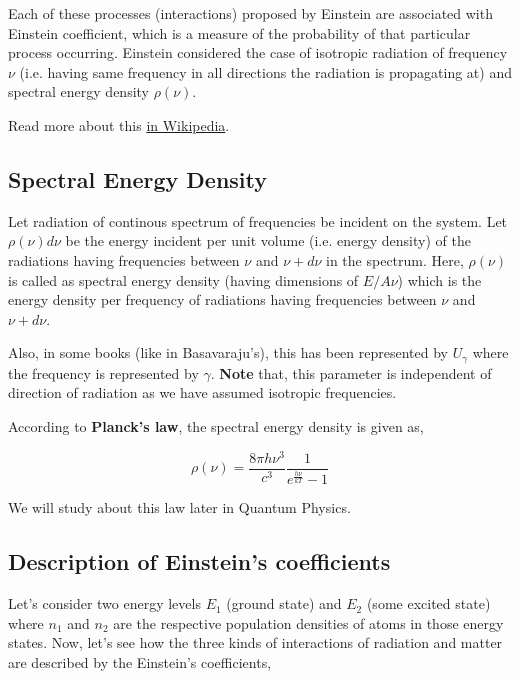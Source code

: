 \documentclass[12pt]{article}
\begin{document}
Each of these processes (interactions) proposed by Einstein are associated with Einstein coefficient, which is a measure of the probability of that particular process occurring. Einstein considered the case of isotropic radiation of frequency $\nu$ (i.e. having same frequency in all directions the radiation is propagating at) and spectral energy density $\rho(\nu)$. \vspace{.2cm}

Read more about this \href{https://en.wikipedia.org/wiki/Einstein_coefficients}{in Wikipedia}.

\subsection{Spectral Energy Density}

Let radiation of continous spectrum of frequencies be incident on the system. Let $\rho(\nu)d\nu$ be the energy incident per unit volume (i.e. energy density) of the radiations having frequencies between $\nu$ and $\nu + d\nu$ in the spectrum. Here, $\rho(\nu)$ is called as spectral energy density (having dimensions of $E/A\nu$) which is the energy density per frequency of radiations having frequencies between $\nu$ and $\nu + d\nu$. \vspace{.2cm}

Also, in some books (like in Basavaraju's), this has been represented by $U_{\gamma}$ where the frequency is represented by $\gamma$. \textbf{Note} that, this parameter is independent of direction of radiation as we have assumed isotropic frequencies. \vspace{.2cm}

According to \textbf{Planck's law}, the spectral energy density is given as,

\begin{equation}
    \rho(\nu) = \frac{8\pi h\nu^3}{c^3} \frac{1}{e^\frac{h\nu}{kT} - 1}
\end{equation}

We will study about this law later in Quantum Physics.

\subsection{Description of Einstein's coefficients}

Let's consider two energy levels $E_{1}$ (ground state) and $E_{2}$ (some excited state) where $n_{1}$ and $n_{2}$ are the respective population densities of atoms in those energy states. Now, let's see how the three kinds of interactions of radiation and matter are described by the Einstein's coefficients,
\end{document}
